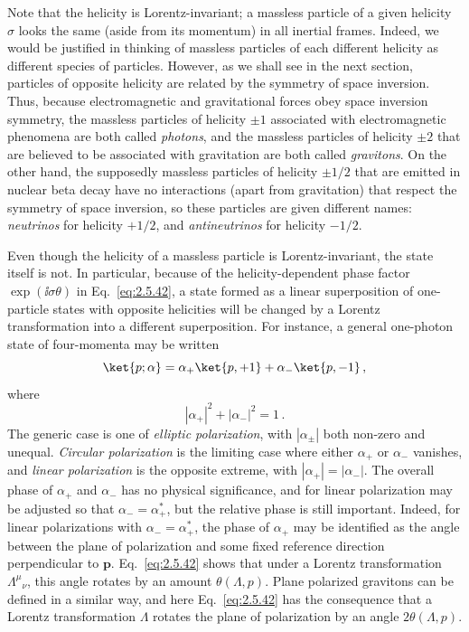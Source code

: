 Note that the helicity is Lorentz-invariant; a massless particle of a given
helicity $\sigma$ looks the same (aside from its momentum) in all inertial
frames. Indeed, we would be justified in thinking of massless particles of
each different helicity as different species of particles. However, as we
shall see in the next section, particles of opposite helicity are related by
the symmetry of space inversion. Thus, because electromagnetic and
gravitational forces obey space inversion symmetry, the massless particles of
helicity $\pm1$ associated with electromagnetic phenomena are both called
\emph{photons}, and the massless particles of helicity $\pm2$ that are believed
to be associated with gravitation are both called \emph{gravitons}. On the
other hand, the supposedly massless particles of helicity $\pm1/2$ that are
emitted in nuclear beta decay have no interactions (apart from gravitation)
that respect the symmetry of space inversion, so these particles are given
different names: \emph{neutrinos} for helicity $+1/2$, and
\emph{antineutrinos} for helicity $-1/2$.

Even though the helicity of a massless particle is Lorentz-invariant, the state
itself is not. In particular, because of the helicity-dependent phase factor
$\exp(\ii\sigma\theta)$ in Eq.~\eqref{eq:2.5.42}, a state formed as a linear superposition
of one-particle states with opposite helicities will be changed by a Lorentz
transformation into a different superposition. For instance, a general
one-photon state of four-momenta may be written
\[
\ket{p;\alpha}=\alpha_+\ket{p,+1}+\alpha_-\ket{p,-1}\,,
\]
where
\[
|\alpha_+|^2+|\alpha_-|^2=1\,.
\]
The generic case is one of \emph{elliptic polarization}, with
$|\alpha_\pm|$ both non-zero and unequal. \emph{Circular polarization} is the
limiting case where either $\alpha_+$ or $\alpha_-$ vanishes, and
\emph{linear polarization} is the opposite extreme, with
$|\alpha_+|=|\alpha_-|$. The overall phase of $\alpha_+$ and $\alpha_-$ has no
physical significance, and for linear polarization may be adjusted so that
$\alpha_-=\alpha_+^*$, but the relative phase is still important. Indeed, for
linear polarizations with $\alpha_-=\alpha_+^*$, the phase of $\alpha_+$ may be
identified as the angle between the plane of polarization and some fixed
reference direction perpendicular to $\mathbf{p}$. Eq.~\eqref{eq:2.5.42} shows that
under a Lorentz transformation $\Lambda^\mu{}_{\nu}$, this angle rotates by an
amount $\theta(\Lambda,p)$. Plane polarized gravitons can be defined in a
similar way, and here Eq.~\eqref{eq:2.5.42} has the consequence that a Lorentz
transformation $\Lambda$ rotates the plane of polarization by an angle
$2\theta(\Lambda,p)$.
